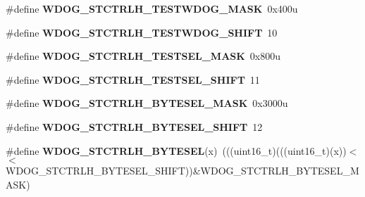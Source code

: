 \begin{DoxyCompactItemize}
\item 
\#define {\bfseries W\+D\+O\+G\+\_\+\+S\+T\+C\+T\+R\+L\+H\+\_\+\+T\+E\+S\+T\+W\+D\+O\+G\+\_\+\+M\+A\+SK}~0x400u\hypertarget{group__WDOG__Register__Masks_ga155c6ba1a6269c937ad8a1e1500686aa}{}\label{group__WDOG__Register__Masks_ga155c6ba1a6269c937ad8a1e1500686aa}

\item 
\#define {\bfseries W\+D\+O\+G\+\_\+\+S\+T\+C\+T\+R\+L\+H\+\_\+\+T\+E\+S\+T\+W\+D\+O\+G\+\_\+\+S\+H\+I\+FT}~10\hypertarget{group__WDOG__Register__Masks_ga3b923179c1bd41abe9fbab0ee57740c0}{}\label{group__WDOG__Register__Masks_ga3b923179c1bd41abe9fbab0ee57740c0}

\item 
\#define {\bfseries W\+D\+O\+G\+\_\+\+S\+T\+C\+T\+R\+L\+H\+\_\+\+T\+E\+S\+T\+S\+E\+L\+\_\+\+M\+A\+SK}~0x800u\hypertarget{group__WDOG__Register__Masks_gad8ac03c1a9c77ee59f938c243db30a42}{}\label{group__WDOG__Register__Masks_gad8ac03c1a9c77ee59f938c243db30a42}

\item 
\#define {\bfseries W\+D\+O\+G\+\_\+\+S\+T\+C\+T\+R\+L\+H\+\_\+\+T\+E\+S\+T\+S\+E\+L\+\_\+\+S\+H\+I\+FT}~11\hypertarget{group__WDOG__Register__Masks_gaf41cdd95d386a6b663fa3adea03699e1}{}\label{group__WDOG__Register__Masks_gaf41cdd95d386a6b663fa3adea03699e1}

\item 
\#define {\bfseries W\+D\+O\+G\+\_\+\+S\+T\+C\+T\+R\+L\+H\+\_\+\+B\+Y\+T\+E\+S\+E\+L\+\_\+\+M\+A\+SK}~0x3000u\hypertarget{group__WDOG__Register__Masks_ga20d3012eda5935f73ec4a9e24720fdc2}{}\label{group__WDOG__Register__Masks_ga20d3012eda5935f73ec4a9e24720fdc2}

\item 
\#define {\bfseries W\+D\+O\+G\+\_\+\+S\+T\+C\+T\+R\+L\+H\+\_\+\+B\+Y\+T\+E\+S\+E\+L\+\_\+\+S\+H\+I\+FT}~12\hypertarget{group__WDOG__Register__Masks_ga0f73c2f0d56eac9caafc8a0337f95cc8}{}\label{group__WDOG__Register__Masks_ga0f73c2f0d56eac9caafc8a0337f95cc8}

\item 
\#define {\bfseries W\+D\+O\+G\+\_\+\+S\+T\+C\+T\+R\+L\+H\+\_\+\+B\+Y\+T\+E\+S\+EL}(x)~(((uint16\+\_\+t)(((uint16\+\_\+t)(x))$<$$<$W\+D\+O\+G\+\_\+\+S\+T\+C\+T\+R\+L\+H\+\_\+\+B\+Y\+T\+E\+S\+E\+L\+\_\+\+S\+H\+I\+FT))\&W\+D\+O\+G\+\_\+\+S\+T\+C\+T\+R\+L\+H\+\_\+\+B\+Y\+T\+E\+S\+E\+L\+\_\+\+M\+A\+SK)\hypertarget{group__WDOG__Register__Masks_ga13958aa7d857b661998e304c5b3b4ea7}{}\label{group__WDOG__Register__Masks_ga13958aa7d857b661998e304c5b3b4ea7}


\end{DoxyCompactItemize}
